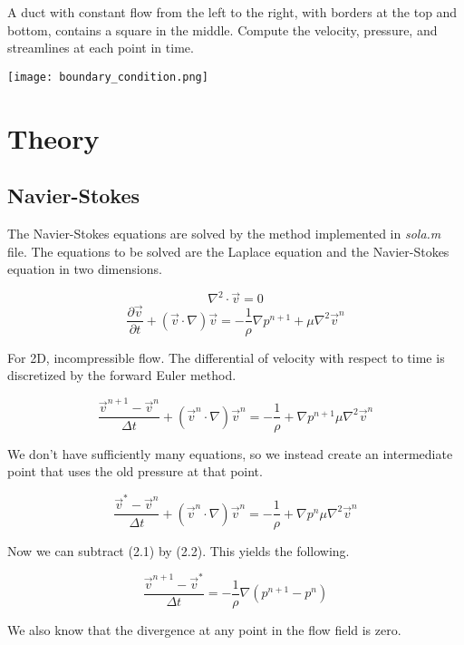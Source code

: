 \documentclass[listof=totoc]{report}
\begin{document}
A duct with constant flow from the left to the right, with borders at the top and bottom, contains a square in the middle. Compute the velocity, pressure, and streamlines at each point in time. \\

\begin{center}
\texttt{[image: boundary\_condition.png]}
\end{center}

\chapter{Theory}
\section{Navier-Stokes}
The Navier-Stokes equations are solved by the method implemented in \emph{sola.m} file. The equations to be solved are the Laplace equation and the Navier-Stokes equation in two dimensions.

$$ \nabla^2 \cdot \vec{v} = 0 $$
$$ \frac{\partial \vec{v}}{\partial t} + (\vec{v} \cdot \nabla) \vec{v} = -\frac{1}{\rho} \nabla p^{n+1} + \mu \nabla^2 \vec{v}^n $$

For 2D, incompressible flow.
The differential of velocity with respect to time is discretized by the forward Euler method.

\begin{equation}
\frac{\vec{v}^{n+1} - \vec{v}^n}{\Delta t} + (\vec{v}^n \cdot \nabla) \vec{v}^n = -\frac{1}{\rho} + \nabla p^{n+1} \mu \nabla^2 \vec{v}^n
\end{equation}

We don't have sufficiently many equations, so we instead create an intermediate point that uses the old pressure at that point.

\begin{equation}
\frac{\vec{v}^{*} - \vec{v}^n}{\Delta t} + (\vec{v}^n \cdot \nabla) \vec{v}^n = -\frac{1}{\rho} + \nabla p^{n} \mu \nabla^2 \vec{v}^n
\end{equation}

Now we can subtract (2.1) by (2.2). This yields the following.

\begin{equation}
\frac{\vec{v}^{n+1} - \vec{v}^*}{\Delta t} = -\frac{1}{\rho} \nabla (p^{n+1} - p^{n})
\end{equation}

We also know that the divergence at any point in the flow field is zero.
\end{document}
